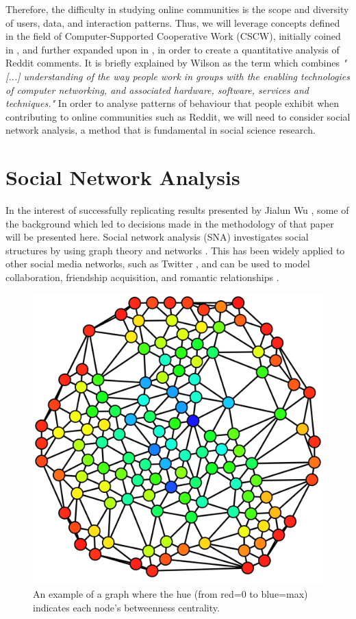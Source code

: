 \documentclass[bsc,frontabs,twoside,singlespacing,parskip,deptreport]{infthesis}
\begin{document}
Therefore, the difficulty in studying online communities is the scope and diversity of users, data, and interaction patterns. Thus, we will leverage concepts defined in the field of Computer-Supported Cooperative Work (CSCW), initially coined in \cite{1988Ccw:}, and further expanded upon in \cite{WilsonPaul1991CSCW}, in order to create a quantitative analysis of Reddit comments. It is briefly explained by Wilson as the term which combines \textit{"[...] understanding of the way people work in groups with the enabling technologies of computer networking, and associated hardware, software, services and techniques."} In order to analyse patterns of behaviour that people exhibit when contributing to online communities such as Reddit, we will need to consider social network analysis, a method that is fundamental in social science research.

\section{Social Network Analysis}\label{sna}
In the interest of successfully replicating results presented by Jialun Wu \cite{masters}, some of the background which led to decisions made in the methodology of that paper will be presented here. Social network analysis (SNA) investigates social structures by using graph theory and networks \cite{OtteEvelien2002Snaa}. This has been widely applied to other social media networks, such as Twitter \cite{GrandjeanMartin2016Asna}, and can be used to model collaboration, friendship acquisition, and romantic relationships \cite{abraham2009computational}.

\begin{figure}[htb]\label{graph}
	\centering
 	\includegraphics[width=.6\textwidth]{graph.png}
  	\caption{An example of a graph where the hue (from red=0 to blue=max) indicates each node's betweenness centrality. \cite{fig:graph}}
\end{figure}
\end{document}
